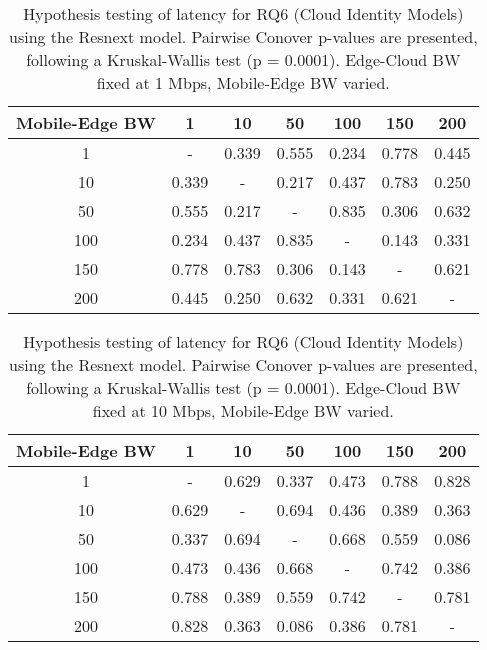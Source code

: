 \begin{table}[H]
\caption{Hypothesis testing of latency for RQ6 (Cloud Identity Models) using the Resnext model. Pairwise Conover p-values are presented, following a Kruskal-Wallis test (p = 0.0001). Edge-Cloud BW fixed at 1 Mbps, Mobile-Edge BW varied.}
\centering
\begin{tabular}{c|cccccc}
Mobile-Edge BW & 1 & 10 & 50 & 100 & 150 & 200 \\
\hline
1 & - & 0.339 & 0.555 & 0.234 & 0.778 & 0.445 \\
10 & 0.339 & - & 0.217 & 0.437 & 0.783 & 0.250 \\
50 & 0.555 & 0.217 & - & 0.835 & 0.306 & 0.632 \\
100 & 0.234 & 0.437 & 0.835 & - & 0.143 & 0.331 \\
150 & 0.778 & 0.783 & 0.306 & 0.143 & - & 0.621 \\
200 & 0.445 & 0.250 & 0.632 & 0.331 & 0.621 & - \\
\end{tabular}
\end{table}

\begin{table}[H]
\caption{Hypothesis testing of latency for RQ6 (Cloud Identity Models) using the Resnext model. Pairwise Conover p-values are presented, following a Kruskal-Wallis test (p = 0.0001). Edge-Cloud BW fixed at 10 Mbps, Mobile-Edge BW varied.}
\centering
\begin{tabular}{c|cccccc}
Mobile-Edge BW & 1 & 10 & 50 & 100 & 150 & 200 \\
\hline
1 & - & 0.629 & 0.337 & 0.473 & 0.788 & 0.828 \\
10 & 0.629 & - & 0.694 & 0.436 & 0.389 & 0.363 \\
50 & 0.337 & 0.694 & - & 0.668 & 0.559 & 0.086 \\
100 & 0.473 & 0.436 & 0.668 & - & 0.742 & 0.386 \\
150 & 0.788 & 0.389 & 0.559 & 0.742 & - & 0.781 \\
200 & 0.828 & 0.363 & 0.086 & 0.386 & 0.781 & - \\
\end{tabular}
\end{table}

